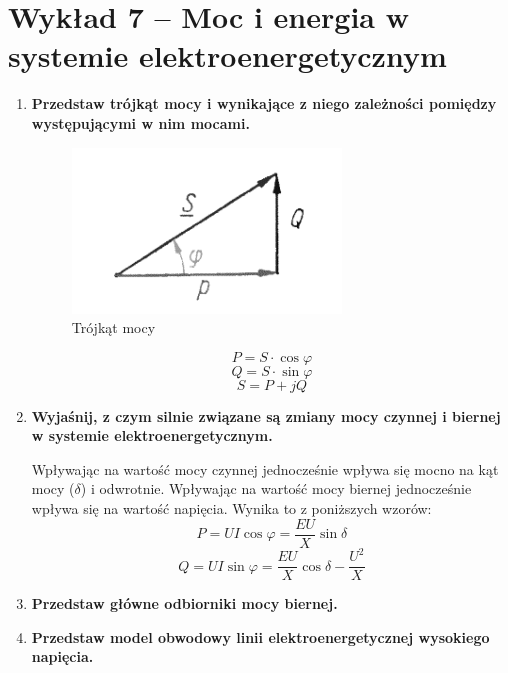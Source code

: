 \documentclass[12pt]{article}
\newcommand{\pytanie}[1]{\item \textbf{#1}}
\begin{document}
\section{Wykład 7 -- Moc i energia w systemie elektroenergetycznym}
\begin{enumerate}
    \pytanie{Przedstaw trójkąt mocy i wynikające z niego zależności pomiędzy występującymi 
    w nim mocami.}

        \begin{figure}[H]
            \centering
            \includegraphics[width=0.3\linewidth]{images/wyklad7_1.png}
            \caption*{Trójkąt mocy}
        \end{figure}
        \begin{equation*}
            P = S \cdot \cos\varphi
        \end{equation*}
        \begin{equation*}
            Q = S \cdot \sin\varphi
        \end{equation*}
        \begin{equation*}
            S = P + jQ
        \end{equation*}

    \pytanie{Wyjaśnij, z czym silnie związane są zmiany mocy czynnej i biernej w systemie 
    elektroenergetycznym.}

        Wpływając na wartość mocy czynnej jednocześnie wpływa się mocno na kąt mocy ($\delta$) i odwrotnie.
        Wpływając na wartość mocy biernej jednocześnie wpływa się na wartość napięcia.
        Wynika to z poniższych wzorów:
        \begin{equation*}
            P = U I \cos\varphi = \frac{E U}{X} \sin\delta
        \end{equation*}
        \begin{equation*}
            Q = U I \sin\varphi = \frac{E U}{X} \cos\delta - \frac{U^2}{X}
        \end{equation*}

    \pytanie{Przedstaw główne odbiorniki mocy biernej.}

        

    \pytanie{Przedstaw model obwodowy linii elektroenergetycznej wysokiego napięcia.}


\end{enumerate}
\end{document}
